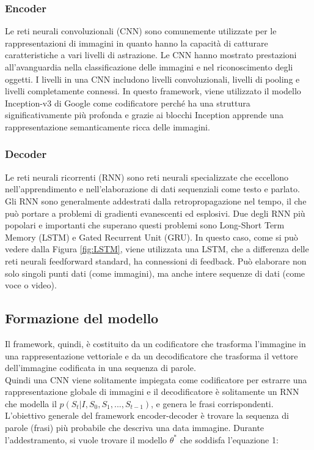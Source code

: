 \documentclass[12pt,a4paper]{report}
\begin{document}
\subsubsection{Encoder}
Le reti neurali convoluzionali (CNN) sono comunemente utilizzate per le rappresentazioni di immagini in quanto hanno la capacità di catturare caratteristiche a vari livelli di astrazione. Le CNN hanno mostrato prestazioni all'avanguardia nella classificazione delle immagini e nel riconoscimento degli oggetti. I livelli in una CNN includono livelli convoluzionali, livelli di pooling e livelli completamente connessi. 
In questo framework, viene utilizzato il modello Inception-v3 di Google come codificatore perché ha una struttura significativamente più profonda e grazie ai blocchi Inception apprende una rappresentazione semanticamente ricca delle immagini.

\subsubsection{Decoder}
Le reti neurali ricorrenti (RNN) sono reti neurali specializzate che eccellono nell'apprendimento e nell'elaborazione di dati sequenziali come testo e parlato. Gli RNN sono generalmente addestrati dalla retropropagazione nel tempo, il che può portare a problemi di gradienti evanescenti ed esplosivi. Due degli RNN più popolari e importanti che superano questi problemi sono Long-Short Term Memory (LSTM) e Gated Recurrent Unit (GRU). In questo caso, come si può vedere dalla Figura \ref{fig:LSTM}, viene utilizzata una LSTM, che a differenza delle reti neurali feedforward standard, ha connessioni di feedback. Può elaborare non solo singoli punti dati (come immagini), ma anche intere sequenze di dati (come voce o video).

\subsection{Formazione del modello}
Il framework, quindi, è costituito da un codificatore che trasforma l'immagine in una rappresentazione vettoriale e da un decodificatore che trasforma il vettore dell'immagine codificata in una sequenza di parole.\\
Quindi una CNN viene solitamente impiegata come codificatore per estrarre una rappresentazione globale di immagini e il decodificatore è solitamente un RNN che modella il $p(S_t|I, S_0, S_1, . . . ,S_{t-1})$, e genera le frasi corrispondenti.\\
L'obiettivo generale del framework encoder-decoder è trovare la sequenza di parole (frasi) più probabile che descriva una data immagine. Durante l'addestramento, si vuole trovare il modello $\theta^*$ che soddisfa l’equazione 1:
\end{document}
